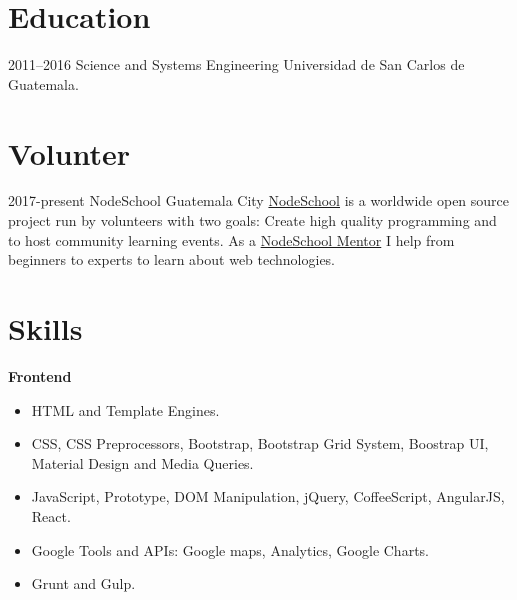 \documentclass[]{friggeri-cv} %
\begin{document}

\section{Education}

\begin{entrylist}

\entry
	{2011--2016}
	{Science and Systems Engineering}
	{Universidad de San Carlos de Guatemala.}
	{}
\end{entrylist}

\section{Volunter}
\begin{entrylist}
\entry
	{2017-present}
	{NodeSchool}
	{Guatemala City}
	{
		\href{https://nodeschool.io}{NodeSchool} is a worldwide open source project run by volunteers with two goals: Create high quality
		programming and to host community learning events. As a \href{https://nodeschool.io/guatemala/}{NodeSchool Mentor}
		I help from beginners to experts to learn about web technologies.
	}
\end{entrylist}

\clearpage
\section{Skills}

\textbf{Frontend}

\begin{itemize}
	\item HTML and Template Engines.
	\item CSS, CSS Preprocessors, Bootstrap, Bootstrap Grid System, Boostrap UI, Material Design and Media Queries.
	\item JavaScript, Prototype, DOM Manipulation, jQuery, CoffeeScript, AngularJS, React.
	\item Google Tools and APIs: Google maps, Analytics, Google Charts.
	\item Grunt and Gulp.
\end{itemize}
\end{document}
